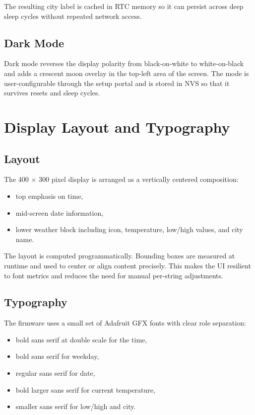\documentclass[11pt]{article}
\begin{document}
The resulting city label is cached in RTC memory so it can persist across deep sleep cycles without repeated network access.

\subsection{Dark Mode}
Dark mode reverses the display polarity from black-on-white to white-on-black and adds a crescent moon overlay in the top-left area of the screen. The mode is user-configurable through the setup portal and is stored in NVS so that it survives resets and sleep cycles.

\section{Display Layout and Typography}
\subsection{Layout}
The 400 \(\times\) 300 pixel display is arranged as a vertically centered composition:
\begin{itemize}
  \item top emphasis on time,
  \item mid-screen date information,
  \item lower weather block including icon, temperature, low/high values, and city name.
\end{itemize}

The layout is computed programmatically. Bounding boxes are measured at runtime and used to center or align content precisely. This makes the UI resilient to font metrics and reduces the need for manual per-string adjustments.

\subsection{Typography}
The firmware uses a small set of Adafruit GFX fonts with clear role separation:
\begin{itemize}
  \item bold sans serif at double scale for the time,
  \item bold sans serif for weekday,
  \item regular sans serif for date,
  \item bold larger sans serif for current temperature,
  \item smaller sans serif for low/high and city.
\end{itemize}
\end{document}
